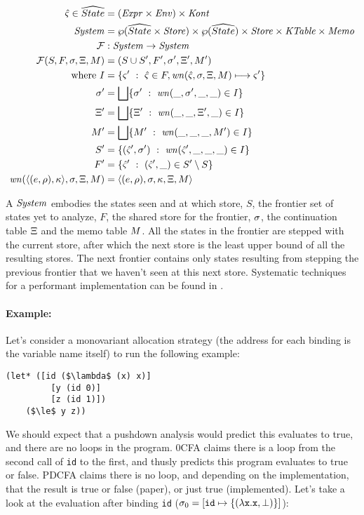 \documentclass{llncs}
\begin{document}
\begin{align*}
  \hat\varsigma \in \widehat{State} &= (\mathit{Expr} \times \mathit{Env}) \times \mathit{Kont} \\
  \mathit{System} &= \wp(\widehat{State} \times \mathit{Store}) \times \wp(\widehat{State}) \times \mathit{Store} \times \mathit{KTable} \times \mathit{Memo} \\
  {\mathcal F} &: \mathit{System} \to \mathit{System} \\
  {\mathcal F}(S, F, \sigma, \Xi, M) &= (S \cup S', F', \sigma', \Xi', M') \\
  \text{where } I &= \{ \varsigma'\ :\ \hat\varsigma \in F, \mathit{wn}(\hat\varsigma,\sigma,\Xi,M) \longmapsto \varsigma'\} \\
                \sigma' &= \bigsqcup\{ \sigma'\ :\ \mathit{wn}(\_, \sigma',\_,\_) \in I\} \\
                \Xi' &=  \bigsqcup\{ \Xi'\ :\ \mathit{wn}(\_, \_, \Xi', \_) \in I\} \\
                M' &=  \bigsqcup\{ M'\ :\ \mathit{wn}(\_, \_, \_, M') \in I\} \\
                S' &= \{ (\hat\varsigma',\sigma')\ :\ \mathit{wn}(\hat\varsigma', \_, \_, \_) \in I\} \\
                F' &= \{ \hat\varsigma'\ :\ (\hat\varsigma',\_) \in S' \setminus S\} \\
                \mathit{wn}(\langle (e,\rho),\kappa \rangle,\sigma,\Xi,M)
                   &= \langle (e,\rho),\sigma,\kappa,\Xi,M \rangle
\end{align*}

A $\mathit{System}$ embodies the states seen and at which store, $S$, the
frontier set of states yet to analyze, $F$, the shared store for the
frontier, $\sigma$, the continuation table $\Xi$ and the memo
table $M$. All the states in the frontier are stepped with the
current store, after which the next store is the least upper bound of
all the resulting stores. The next frontier contains only states
resulting from stepping the previous frontier that we haven't seen at
this next store. Systematic techniques for a performant implementation
can be found in \citet{ianjohnson:oaam:2013}.

\paragraph{Example:} Let's consider a monovariant allocation strategy
(the address for each binding is the variable name itself) to run the
following example:
\begin{lstlisting}[mathescape]
  (let* ([id ($\lambda$ (x) x)]
         [y (id 0)]
         [z (id 1)])
    ($\le$ y z))
\end{lstlisting}
We should expect that a pushdown analysis would predict this evaluates
to true, and there are no loops in the program. 0CFA claims there is a
loop from the second call of \texttt{id} to the first, and thusly
predicts this program evaluates to true or false. PDCFA claims there
is no loop, and depending on the implementation, that the result is
true or false (paper), or just true (implemented). Let's take a look
at the evaluation after binding \texttt{id} ($\sigma_0 = [\texttt{id} \mapsto \{ (\lambda{} \texttt{x}. \texttt{x}, \bot) \}]$):
\end{document}
